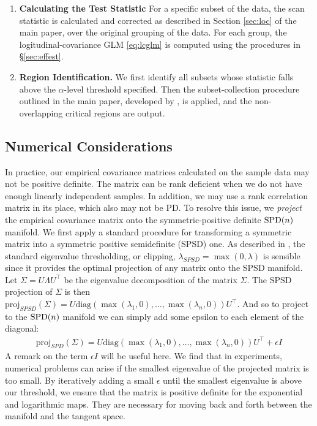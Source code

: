 \begin{enumerate}
\item \textbf{Calculating the Test Statistic} For a specific subset of the data, the scan statistic is calculated and corrected as described in Section \ref{sec:loc} of the main paper, over the original grouping of the data. For each group, the logitudinal-covariance GLM \eqref{eq:lcglm} is computed using the procedures in \S\ref{sec:effest}.
%
\item \textbf{Region Identification.} We first identify all subsets whose statistic falls above the $\alpha$-level threshold specified. Then the subset-collection procedure outlined in the main paper, developed by \cite{jeng2010optimal}, is applied, and the non-overlapping critical regions are output.
\end{enumerate}
%

\subsection*{Numerical Considerations} 
In practice, our empirical covariance matrices calculated on the sample data may not be positive definite. The matrix can be rank deficient when we do not have enough linearly independent samples. 
In addition, we may use a rank correlation matrix in its place, which also may not be PD.
To resolve this issue, we \textit{project} the empirical covariance matrix onto the symmetric-positive definite $\text{SPD}(n)$ manifold. We first apply a standard procedure for transforming a 
symmetric matrix into a symmetric positive semidefinite (SPSD) one. As described in \cite{wu2005analysis}, the standard eigenvalue thresholding, or clipping, $\lambda_{SPSD} = \max(0,\lambda)$ is sensible 
since it provides the optimal projection of any matrix onto the SPSD manifold. 
Let $\Sigma = U\Lambda U^\top$ be the eigenvalue decomposition of the matrix $\Sigma$. The SPSD projection of $\Sigma$ is 
then $\text{proj}_{SPSD}(\Sigma) = U\text{diag}(\max(\lambda_1,0),\ldots,\max(\lambda_n,0))U^\top$. And so to project to the $\text{SPD}(n)$ manifold we can simply add some epsilon to each element of the diagonal: 
\begin{align}
\text{proj}_{SPD}(\Sigma) = U\text{diag}(\max(\lambda_1,0),\ldots,\max(\lambda_n,0))U^\top + \epsilon I
\end{align}
A remark on the term $\epsilon I$ will be useful here. We find that in experiments, numerical problems can arise if the smallest eigenvalue of the projected matrix is too small. 
By iteratively adding a 
small $\epsilon$ until the smallest eigenvalue is above our threshold, we ensure that the matrix is positive definite for the exponential and logarithmic maps. They are necessary for moving back and forth between the manifold and the tangent space.